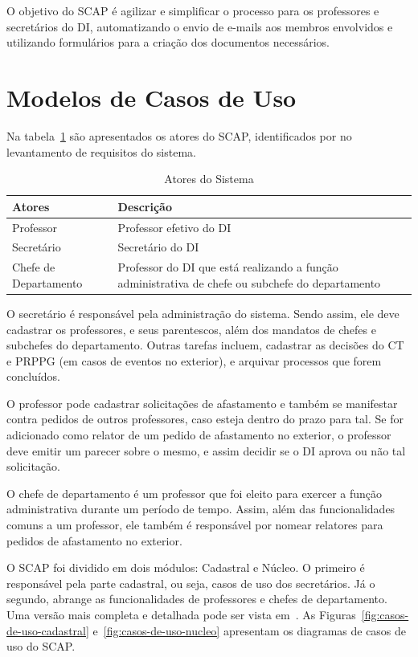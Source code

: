 O objetivo do SCAP é agilizar e simplificar o processo para os professores
e secretários do DI, automatizando o envio de e-mails aos membros envolvidos
e utilizando formulários para a criação dos documentos necessários.


\section{Modelos de Casos de Uso}
\label{sec-espec-casos-uso}

Na tabela~\ref{tab:atores} são apresentados os atores do SCAP, identificados
por  no levantamento de requisitos do sistema.

\begin{table}[h!]
    \centering
    \caption{Atores do Sistema}
    \label{tab:atores}
    \begin{tabular}{|p{5cm}|p{10cm}|}
    \hline
    \textbf{Atores} & \textbf{Descrição}\\ \hline
    Professor & Professor efetivo do DI \\ \hline
    Secretário & Secretário do DI \\ \hline
    Chefe de Departamento & Professor do DI que está realizando a função administrativa de chefe ou subchefe do departamento  \\ \hline
    \end{tabular}
\end{table}

O secretário é responsável pela administração do sistema. Sendo assim,
ele deve cadastrar os professores, e seus parentescos, além dos mandatos
de chefes e subchefes do departamento. Outras tarefas incluem, cadastrar
as decisões do CT e PRPPG (em casos de eventos no exterior), e arquivar
processos que forem concluídos.

O professor pode cadastrar solicitações de afastamento e também se manifestar
contra pedidos de outros professores, caso esteja dentro do prazo para tal.
Se for adicionado como relator de um pedido de afastamento no exterior,
o professor deve emitir um parecer sobre o mesmo, e assim decidir se o
DI aprova ou não tal solicitação.

O chefe de departamento é um professor que foi eleito para exercer a função
administrativa durante um período de tempo. Assim, além das funcionalidades
comuns a um professor, ele também é responsável por nomear relatores
para pedidos de afastamento no exterior.


O SCAP foi dividido em dois módulos: Cadastral e Núcleo. O primeiro é responsável pela parte
cadastral, ou seja, casos de uso dos secretários. Já o segundo, abrange
as funcionalidades de professores e chefes de departamento. Uma versão mais
completa e detalhada pode ser vista em~\cite{duarte:2014,prado:2015}.
As Figuras~\ref{fig:casos-de-uso-cadastral} e~\ref{fig:casos-de-uso-nucleo} apresentam
os diagramas de casos de uso do SCAP.

